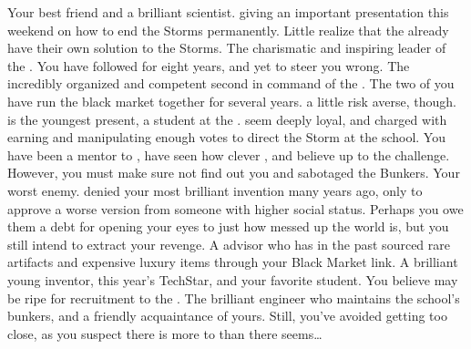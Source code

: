 \documentclass[char]{GL2020}
\begin{document}
\begin{contacts}
    \contact{\cHeadScientist{}} Your best friend and a brilliant scientist. \cHeadScientist{\Theyare} giving an important presentation this weekend on how to end the Storms permanently. Little \cHeadScientist{\do} \cHeadScientist{\they} realize that the \pGoaties{} already have their own solution to the Storms.
    \contact{\cChupLeader{}} The charismatic and inspiring leader of the \pGoaties{}. You have followed \cChupLeader{\them} for eight years, and \cChupLeader{\theyhave} yet to steer you wrong.
    \contact{\cChupSecond{}} The incredibly organized and competent second in command of the \pGoaties{}. The two of you have run the black market together for several years. \cChupSecond{\Theyare} a little risk averse, though.
    \contact{\cChupStudent{}} is the youngest \pGoatie{} present, a student at the \pSc{}. \cChupStudent{\They} seem\cChupStudent{\verbs} deeply loyal, and \cChupStudent{\are} charged with earning and manipulating enough votes to direct the Storm at the school. You have been a mentor to \cChupStudent{}, have seen how clever \cChupStudent{\theyare}, and believe \cChupStudent{\theyare} up to the challenge. However, you must make sure \cChupStudent{\theydo} not find out you and \cChupSecond{} sabotaged the Bunkers. 
    \contact{\cAntiChup{}} Your worst enemy. \cAntiChup{\They} denied your most brilliant invention many years ago, only to approve a worse version from someone with higher social status. Perhaps you owe them a debt for opening your eyes to just how messed up the world is, but you still intend to extract your revenge.
    \contact{\cHedonist{}} A \pFarm{} advisor who has in the past sourced rare artifacts and expensive luxury items through your Black Market link.
    \contact{\cTechStar{}} A brilliant young inventor, this year's TechStar, and your favorite student. You believe \cTechStar{\they} may be ripe for recruitment to the \pGoaties{}. 
    \contact{\cBunker{}} The brilliant engineer who maintains the school’s bunkers, and a friendly acquaintance of yours. Still, you've avoided getting too close, as you suspect there is more to \cBunker{\them} than there seems\ldots{}
\end{contacts}
\end{document}

